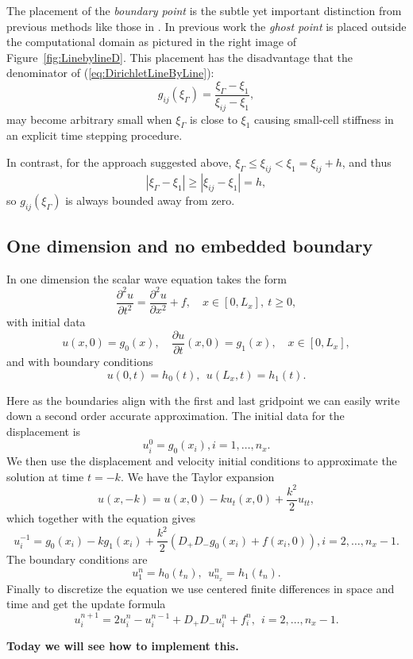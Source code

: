 \documentclass[11pt]{article}
\newcommand{\fig}[1]{\mbox{Figure{~#1}}}
\newcommand{\be}{\begin{equation}}
\newcommand{\ee}{\end{equation}}
\newcommand{\bd}{\begin{displaymath}}
\newcommand{\ed}{\end{displaymath}}
\newcommand{\pa}{\partial}
\newcommand{\f}{\frac}
\newcommand{\dpx}{D_+}
\newcommand{\dmx}{D_-}
\begin{document}
The placement of the \emph{boundary point} is the subtle yet important distinction from previous
methods like those in \cite{Kreiss_Petersson_2006,kreiss:1940,kreiss:1292}. In previous work the \emph{ghost point} is placed outside the
computational domain as pictured in the right image of \fig{\ref{fig:LinebylineD}}. This placement
has the disadvantage that the denominator of (\ref{eq:DirichletLineByLine}):
%
\bd
g_{ij}(\xi_\Gamma) = \f{\xi_\Gamma-\xi_{1}}{\xi_{ij}-\xi_{1}},
\ed
%
may become arbitrary small when $\xi_\Gamma$ is close to $\xi_{1}$ causing small-cell stiffness in
an explicit time stepping procedure.

In contrast, for the approach suggested above, $\xi_\Gamma \le \xi_{ij} < \xi_1 = \xi_{ij}+h$, and thus  
%
\bd
| \xi_\Gamma - \xi_1|  \ge | \xi_{ij} - \xi_1|  = h,
\ed  
%
so $g_{ij}(\xi_\Gamma)$ is always bounded away from zero. 

\subsection{One dimension and no embedded boundary}
In one dimension the scalar wave equation takes the form
%
\be \label{eq:weq1d} 
\f{\pa^2 u}{\pa t^2} =
\f{\pa^2 u}{\pa x^2} + f,\quad x \in [0,L_x],\ t\geq 0,
\ee 
%
with initial data 
%
\be \label{eq:weqid1d} 
u(x,0) = g_0(x), \quad \f{\pa u}{\pa t}(x,0) = g_1(x), \quad x \in [0,L_x],
\ee 
and with boundary conditions 
\be
u(0,t) = h_0(t), \ \ u(L_x,t) = h_1(t).
\ee

Here as the boundaries align with the first and last gridpoint we can easily write down a second order accurate approximation. The initial data for the displacement is
\[
u^0_{i} = g_0({x_i}),  i = 1,\ldots,n_x. 
\]
We then use the displacement and velocity initial conditions to approximate the solution at time $t = -k$. We have the Taylor expansion 
\[
u(x,-k) = u(x,0) - k u_t(x,0) + \frac{k^2}{2} u_{tt},
\]
which together with the equation gives 
\[
u^{-1}_{i} = g_0({x_i}) - k g_1({x_i}) +\frac{k^2}{2} \left( \dpx \dmx g_0(x_i)  + f(x_i,0) \right) ,  i = 2,\ldots,n_x-1. 
\]
The boundary conditions are
\[
u^n_{1} = h_0(t_n), \ \  u^n_{n_x} = h_1(t_n).
\]
Finally to discretize the equation we use centered finite differences in space and time and get the update formula
\be
u^{n+1}_i = 2u^n_i - u^{n-1}_i + \dpx \dmx u^n_i + f^n_i, \ \  i = 2,\ldots,n_x-1. 
\ee

{\bf Today we will see how to implement this.}














\end{document}
